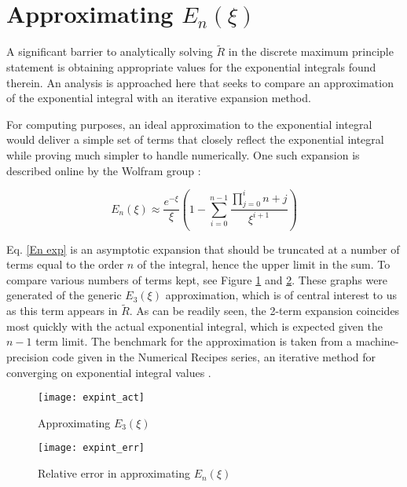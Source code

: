\section{Approximating $E_n(\xi)$}\label{apxEn}
A significant barrier to analytically solving $\tilde R$ in the discrete maximum
principle statement is obtaining appropriate values for the
exponential integrals found therein.  An analysis is approached here that seeks
to compare an approximation of the exponential integral with an iterative
expansion method.

For computing purposes, an ideal approximation to the exponential integral
would deliver a simple set of terms that closely reflect the exponential
integral while proving much simpler to handle numerically.  One such expansion
is described online by the Wolfram group \cite{wolframEn}:

\begin{equation}
E_n(\xi)\approx\frac{e^{-\xi}}{\xi}\left(1-\sum_{i=0}^{n-1}
  \frac{\prod_{j=0}^i n+j}{\xi^{i+1}}\right)\label{En exp}
\end{equation}

Eq. \eqref{En exp} is an asymptotic expansion that should be truncated at a
number of terms equal to the order $n$ of the integral, hence the upper limit
in the sum.  To compare various numbers of terms kept, see Figure \ref{expint}
and \ref{expint_err}.  These graphs were generated of
the generic $E_3(\xi)$ approximation, which is of
central interest to us as this term appears in $\tilde R$. As can be readily
seen, the 2-term expansion coincides most quickly with the actual exponential
integral, which is expected given the $n-1$ term limit.  The benchmark for the
approximation is taken from a machine-precision code given in the Numerical
Recipes series, an iterative method for converging on exponential
integral values \cite{numRec}.
\begin{figure}[htb]
\centering
\texttt{[image: expint\_act]}
\caption{Approximating $E_3(\xi)$}
\label{expint}
\end{figure}

\begin{figure}[htb]
\centering
\texttt{[image: expint\_err]}
\caption{Relative error in approximating $E_n(\xi)$}
\label{expint_err}
\end{figure}

